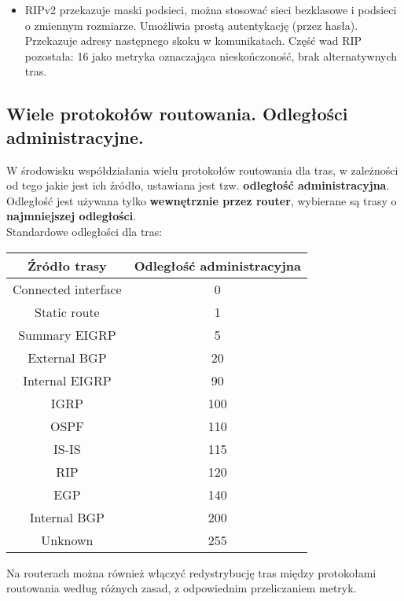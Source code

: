 \documentclass[../main.tex]{subfiles}
\begin{document}
\begin{itemize}
        \item RIPv2 przekazuje maski podsieci, można stosować sieci bezklasowe i podsieci o zmiennym rozmiarze. Umożliwia prostą autentykację (przez hasła). Przekazuje adresy następnego skoku w komunikatach. Część wad RIP pozostała: 16 jako metryka oznaczająca nieskończoność, brak alternatywnych tras.
    \end{itemize}

    \subsection{Wiele protokołów routowania. Odległości administracyjne.}
    W środowisku współdziałania wielu protokołów routowania dla tras, w zależności od tego
    jakie jest ich źródło, ustawiana jest tzw. \textbf{odległość administracyjna}. Odległość jest używana tylko \textbf{wewnętrznie przez router}, wybierane są trasy o \textbf{najmniejszej odległości}.\\

    Standardowe odległości dla tras:\\
    \begin{tabular}{|c|c|}
        \hline
        Źródło trasy & Odległość administracyjna\\
        \hline
        Connected interface & 0\\
        \hline
        Static route & 1\\
        \hline
        Summary EIGRP & 5\\
        \hline
        External BGP & 20\\
        \hline
        Internal EIGRP & 90\\
        \hline
        IGRP & 100\\
        \hline
        OSPF & 110\\
        \hline
        IS-IS & 115\\
        \hline
        RIP & 120\\
        \hline
        EGP & 140\\
        \hline
        Internal BGP & 200\\
        \hline
        Unknown & 255\\
        \hline
    \end{tabular}

    Na routerach można również włączyć redystrybucję tras między protokołami routowania
    według różnych zasad, z odpowiednim przeliczaniem metryk.
\end{document}
